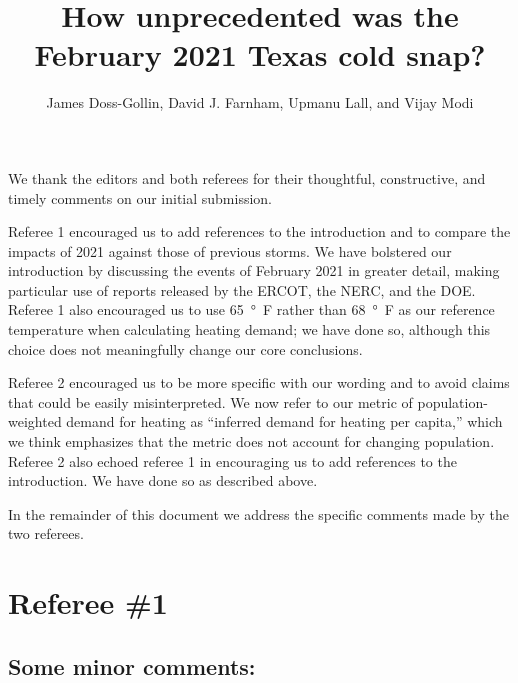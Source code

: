 \documentclass{ar2rc}
\title{How unprecedented was the February 2021 Texas cold snap?}
\author{James Doss-Gollin, David J. Farnham, Upmanu Lall, and Vijay Modi}
\begin{document}
\maketitle

\listoftodos

We thank the editors and both referees for their thoughtful, constructive, and timely comments on our initial submission.

Referee 1 encouraged us to add references to the introduction and to compare the impacts of 2021 against those of previous storms.
We have bolstered our introduction by discussing the events of February 2021 in greater detail, making particular use of reports released by the ERCOT, the NERC, and the DOE.
Referee 1 also encouraged us to use \SI{65}{\degree F} rather than \SI{68}{\degree F} as our reference temperature when calculating heating demand; we have done so, although this choice does not meaningfully change our core conclusions.

Referee 2 encouraged us to be more specific with our wording and to avoid claims that could be easily misinterpreted.
We now refer to our metric of population-weighted demand for heating as ``inferred demand for heating per capita,'' which we think emphasizes that the metric does not account for changing population.
Referee 2 also echoed referee 1 in encouraging us to add references to the introduction.
We have done so as described above.

In the remainder of this document we address the specific comments made by the two referees.

\section{Referee \#1}



\subsection{Some minor comments:}
\end{document}
